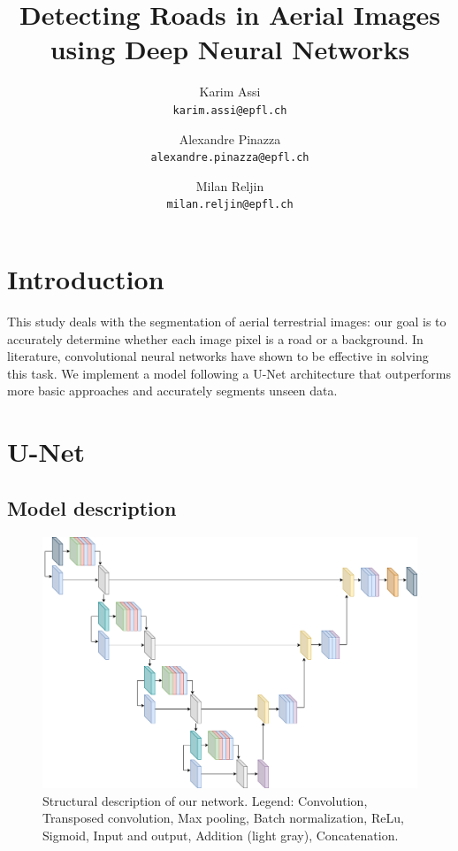\documentclass[10pt,conference,compsocconf]{IEEEtran}
\begin{document}
\title{Detecting Roads in Aerial Images using Deep Neural Networks}
\author{
  Karim Assi\\
  \texttt{karim.assi@epfl.ch}
  \and
  Alexandre Pinazza\\
  \texttt{alexandre.pinazza@epfl.ch}
  \and
  Milan Reljin\\
  \texttt{milan.reljin@epfl.ch}
}

\maketitle

    

\section{Introduction}

This study deals with the segmentation of aerial terrestrial images: our goal is to accurately determine whether each image pixel is a road or a background. In literature, convolutional neural networks have shown to be effective in solving this task. We implement a model following a U-Net architecture that outperforms more basic approaches and accurately segments unseen data. 

\section{U-Net}

\subsection{Model description}

\begin{figure}
    \centering
    \includegraphics[width = \textwidth, height = 0.5 \textwidth]{doc/images/Unet.png}
    \caption{Structural description of our network. Legend: 
    \textcolor{conv}{Convolution},
    \textcolor{convtransp}{Transposed convolution},
    \textcolor{maxpool}{Max pooling},
    \textcolor{batchnorm}{Batch normalization},
    \textcolor{relu}{ReLu}, \textcolor{sigmoid}{Sigmoid},
    \textcolor{io}{Input and output}, \textcolor{add}{Addition} (light gray), \textcolor{concat}{Concatenation}.}
    \label{fig:model_arch}
\end{figure}
\end{document}
